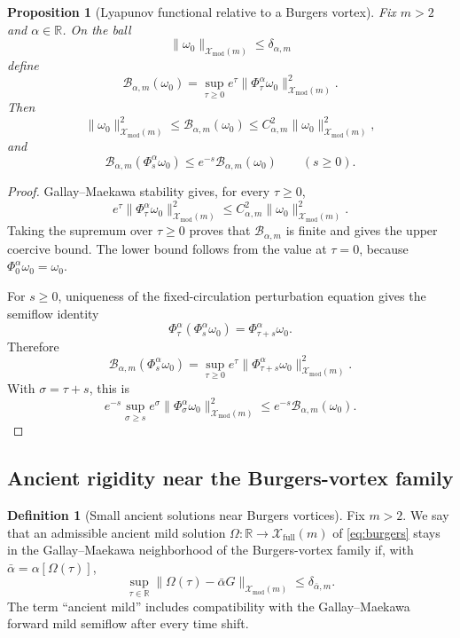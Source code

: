 \documentclass[11pt]{amsart}
\theoremstyle{plain}
\newtheorem{proposition}[theorem]{Proposition}
\theoremstyle{definition}
\newtheorem{definition}[theorem]{Definition}
\theoremstyle{remark}
\numberwithin{equation}{section}
\begin{document}
\begin{proposition}[Lyapunov functional relative to a Burgers vortex]\label{prop:bv-lyap}
Fix \(m>2\) and \(\alpha\in\mathbb R\).  On the ball
\[
   \|\omega_0\|_{\mathcal X_{\mathrm{mod}}(m)}
   \le\delta_{\alpha,m}
\]
define
\begin{equation}\label{eq:bv-lyap}
   \mathcal B_{\alpha,m}(\omega_0)
   =
   \sup_{\tau\ge0}e^\tau
   \|\Phi_\tau^\alpha\omega_0\|_{\mathcal X_{\mathrm{mod}}(m)}^2 .
\end{equation}
Then
\[
   \|\omega_0\|_{\mathcal X_{\mathrm{mod}}(m)}^2
   \le
   \mathcal B_{\alpha,m}(\omega_0)
   \le
   C_{\alpha,m}^2
   \|\omega_0\|_{\mathcal X_{\mathrm{mod}}(m)}^2,
\]
and
\[
   \mathcal B_{\alpha,m}(\Phi_s^\alpha\omega_0)
   \le
   e^{-s}\mathcal B_{\alpha,m}(\omega_0)
   \qquad(s\ge0).
\]
\end{proposition}

\begin{proof}
Gallay--Maekawa stability gives, for every \(\tau\ge0\),
\[
   e^\tau
   \|\Phi_\tau^\alpha\omega_0\|_{\mathcal X_{\mathrm{mod}}(m)}^2
   \le
   C_{\alpha,m}^2
   \|\omega_0\|_{\mathcal X_{\mathrm{mod}}(m)}^2 .
\]
Taking the supremum over \(\tau\ge0\) proves that
\(\mathcal B_{\alpha,m}\) is finite and gives the upper coercive bound.  The
lower bound follows from the value at \(\tau=0\), because
\(\Phi_0^\alpha\omega_0=\omega_0\).

For \(s\ge0\), uniqueness of the fixed-circulation perturbation equation gives
the semiflow identity
\[
   \Phi_\tau^\alpha(\Phi_s^\alpha\omega_0)
   =
   \Phi_{\tau+s}^\alpha\omega_0 .
\]
Therefore
\[
   \mathcal B_{\alpha,m}(\Phi_s^\alpha\omega_0)
   =
   \sup_{\tau\ge0}
   e^\tau
   \|\Phi_{\tau+s}^\alpha\omega_0\|_{\mathcal X_{\mathrm{mod}}(m)}^2 .
\]
With \(\sigma=\tau+s\), this is
\[
   e^{-s}\sup_{\sigma\ge s}
   e^\sigma
   \|\Phi_\sigma^\alpha\omega_0\|_{\mathcal X_{\mathrm{mod}}(m)}^2
   \le
   e^{-s}\mathcal B_{\alpha,m}(\omega_0).
\]
\end{proof}

\subsection{Ancient rigidity near the Burgers-vortex family}

\begin{definition}[Small ancient solutions near Burgers vortices]\label{def:bv-neighborhood}
Fix \(m>2\).  We say that an admissible ancient mild solution
\(\Omega:\mathbb R\to\mathcal X_{\mathrm{full}}(m)\) of \eqref{eq:burgers}
stays in the Gallay--Maekawa neighborhood of the Burgers-vortex family if,
with
\(\bar\alpha=\alpha[\Omega(\tau)]\),
\[
   \sup_{\tau\in\mathbb R}
   \|\Omega(\tau)-\bar\alpha G\|_{\mathcal X_{\mathrm{mod}}(m)}
   \le
   \delta_{\bar\alpha,m}.
\]
The term ``ancient mild'' includes compatibility with the
Gallay--Maekawa forward mild semiflow after every time shift.
\end{definition}
\end{document}
